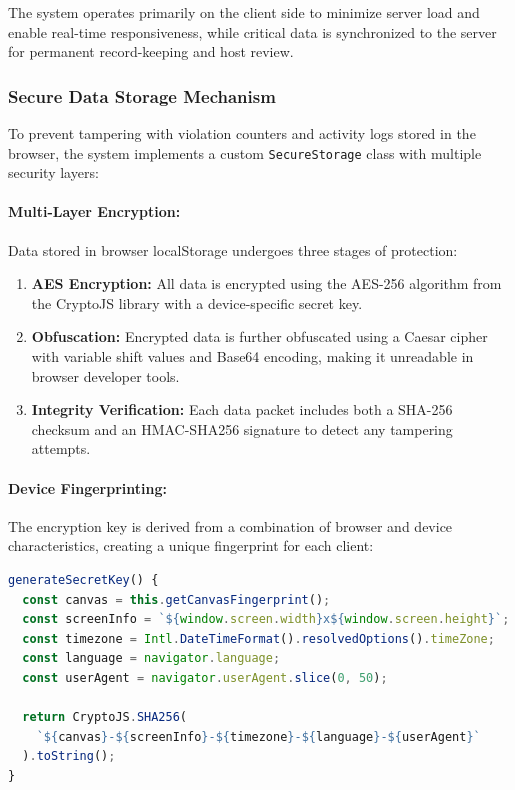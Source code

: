 The system operates primarily on the client side to minimize server load and enable real-time responsiveness, while critical data is synchronized to the server for permanent record-keeping and host review.

\subsubsection{Secure Data Storage Mechanism}

To prevent tampering with violation counters and activity logs stored in the browser, the system implements a custom \texttt{SecureStorage} class with multiple security layers:

\paragraph{Multi-Layer Encryption:}
Data stored in browser localStorage undergoes three stages of protection:

\begin{enumerate}
    \item \textbf{AES Encryption:} All data is encrypted using the AES-256 algorithm from the CryptoJS library with a device-specific secret key.
    
    \item \textbf{Obfuscation:} Encrypted data is further obfuscated using a Caesar cipher with variable shift values and Base64 encoding, making it unreadable in browser developer tools.
    
    \item \textbf{Integrity Verification:} Each data packet includes both a SHA-256 checksum and an HMAC-SHA256 signature to detect any tampering attempts.
\end{enumerate}

\paragraph{Device Fingerprinting:}
The encryption key is derived from a combination of browser and device characteristics, creating a unique fingerprint for each client:

\begin{lstlisting}[language=JavaScript, caption={Device Fingerprinting for Encryption Key Generation}]
generateSecretKey() {
  const canvas = this.getCanvasFingerprint();
  const screenInfo = `${window.screen.width}x${window.screen.height}`;
  const timezone = Intl.DateTimeFormat().resolvedOptions().timeZone;
  const language = navigator.language;
  const userAgent = navigator.userAgent.slice(0, 50);
  
  return CryptoJS.SHA256(
    `${canvas}-${screenInfo}-${timezone}-${language}-${userAgent}`
  ).toString();
}
\end{lstlisting}

